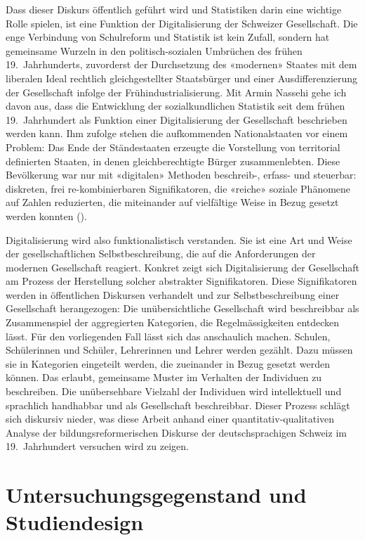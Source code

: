 Dass dieser Diskurs öffentlich geführt wird und Statistiken darin eine wichtige Rolle spielen, ist eine Funktion der Digitalisierung der Schweizer Gesellschaft. Die enge Verbindung von Schulreform und Statistik ist kein Zufall, sondern hat gemeinsame Wurzeln in den politisch-sozialen Umbrüchen des frühen 19.~Jahrhunderts, zuvorderst der Durchsetzung des «modernen» Staates mit dem liberalen Ideal rechtlich gleichgestellter Staatsbürger und einer Ausdifferenzierung der Gesellschaft infolge der Frühindustrialisierung. Mit Armin Nassehi gehe ich davon aus, dass die Entwicklung der sozialkundlichen Statistik seit dem frühen 19.~Jahrhundert als Funktion einer Digitalisierung der Gesellschaft beschrieben werden kann. Ihm zufolge stehen die aufkommenden Nationalstaaten vor einem Problem: Das Ende der Ständestaaten erzeugte die Vorstellung von territorial definierten Staaten, in denen gleichberechtigte Bürger zusammenlebten. Diese Bevölkerung war nur mit «digitalen» Methoden beschreib-, erfass- und steuerbar: diskreten, frei re-kombinierbaren Signifikatoren, die «reiche» soziale Phänomene auf Zahlen reduzierten, die miteinander auf vielfältige Weise in Bezug gesetzt werden konnten (\cite[63]{nassehi_muster_2019}). 

Digitalisierung wird also funktionalistisch verstanden. Sie ist eine Art und Weise der gesellschaftlichen Selbstbeschreibung, die auf die Anforderungen der modernen Gesellschaft reagiert. Konkret zeigt sich Digitalisierung der Gesellschaft am Prozess der Herstellung solcher abstrakter Signifikatoren. Diese Signifikatoren werden in öffentlichen Diskursen verhandelt und zur Selbstbeschreibung einer Gesellschaft herangezogen: Die unübersichtliche Gesellschaft wird beschreibbar als Zusammenspiel der aggregierten Kategorien, die Regelmässigkeiten entdecken lässt. Für den vorliegenden Fall lässt sich das anschaulich machen. Schulen, Schülerinnen und Schüler, Lehrerinnen und Lehrer werden gezählt. Dazu müssen sie in Kategorien eingeteilt werden, die zueinander in Bezug gesetzt werden können. Das erlaubt, gemeinsame Muster im Verhalten der Individuen zu beschreiben. Die unübersehbare Vielzahl der Individuen wird intellektuell und sprachlich handhabbar und als Gesellschaft beschreibbar. Dieser Prozess schlägt sich diskursiv nieder, was diese Arbeit anhand einer quantitativ-qualitativen Analyse der bildungsreformerischen Diskurse der deutschsprachigen Schweiz im 19.~Jahrhundert versuchen wird zu zeigen.

\section{Untersuchungsgegenstand und Studiendesign}

